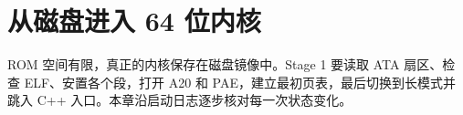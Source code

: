 \chapter{从磁盘进入 64 位内核}

ROM 空间有限，真正的内核保存在磁盘镜像中。Stage 1 要读取 ATA 扇区、检查
ELF、安置各个段，打开 A20 和 PAE，建立最初页表，最后切换到长模式并跳入
C++ 入口。本章沿启动日志逐步核对每一次状态变化。








